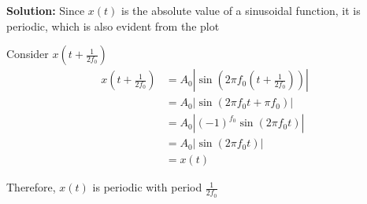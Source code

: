 \documentclass[journal,12pt,twocolumn]{IEEEtran}
\newcommand{\solution}{\noindent \textbf{Solution: }}
\providecommand{\brak}[1]{\ensuremath{\left(#1\right)}}
\providecommand{\abs}[1]{\left\vert#1\right\vert}
\numberwithin{equation}{section}
\numberwithin{figure}{section}
\renewcommand\thesection{\arabic{section}}
\begin{document}
\begin{enumerate}[label=\thesection.\arabic*,ref=\thesection.\theenumi]
	\solution Since $x(t)$ is the absolute value of a sinusoidal function, it is periodic, which is also evident from the plot
	
	Consider $x(t+\frac{1}{2f_0})$
	\begin{align}
		x\brak{t+\frac{1}{2f_0}} &= A_0 \abs{\sin\brak{2\pi f_0 \brak{t+\frac{1}{2f_0}}}} \\
		&= A_0 \abs{\sin\brak{2\pi f_0 t + \pi f_0}} \\
		&= A_0\abs{(-1)^{f_0} \sin\brak{2\pi f_0 t}} \\
		&= A_0\abs{\sin\brak{2\pi f_0 t}} \\
		&= x(t)
	\end{align}
	
	Therefore, $x(t)$ is periodic with period $\frac{1}{2f_0}$
	
	\end{enumerate}
	
\end{document}
